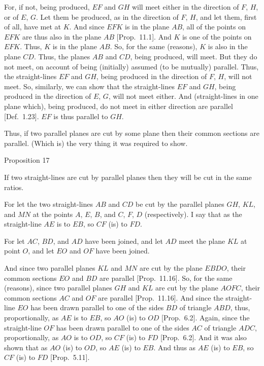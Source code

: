 \centerline{}

For, if not, being produced, $EF$ and $GH$ will  meet either in the direction of $F$, $H$, 
 or of $E$, $G$. Let them  be produced, as  in the  direction of $F$, $H$, and let them, first of all, have met at $K$. And since $EFK$ is in the plane $AB$, all
 of the points on $EFK$ are thus also in the plane $AB$ [Prop.~11.1]. And $K$ is one of the points on $EFK$. Thus, $K$ is in the
 plane $AB$. So, for the same (reasons), $K$ is also in the plane $CD$. 
 Thus, the planes $AB$ and $CD$, being produced, will meet. But they do
 not meet, on account of being (initially) assumed (to be mutually) parallel. Thus,
 the straight-lines $EF$ and $GH$, being produced in the
direction of $F$, $H$, will not meet. So, similarly, we can show that the straight-lines
 $EF$ and $GH$, being produced in the direction of $E$, $G$, will not meet
 either. And (straight-lines in one plane which), being produced,  do not meet in either direction
 are parallel [Def.~1.23]. $EF$ is thus parallel to $GH$.
 
 Thus, if two parallel planes are cut by some plane
then their common sections are parallel. (Which is) the very thing it was
required to show.



\begin{center}
{\large Proposition 17}
\end{center}

If two straight-lines are cut by parallel planes then
they will be cut in the same ratios.

For let the two straight-lines $AB$ and $CD$ be cut by the parallel planes
$GH$, $KL$, and $MN$ at the points $A$, $E$, $B$,  and $C$, $F$, $D$ (respectively). I say that as the straight-line $AE$ is to $EB$, so $CF$ (is)
to $FD$.

For let $AC$, $BD$, and $AD$ have been joined, and let $AD$ meet the
plane $KL$ at point $O$, and let $EO$ and $OF$ have been joined.

And since two parallel planes $KL$ and $MN$ are cut by the
plane $EBDO$, their common sections $EO$ and $BD$ are parallel
[Prop.~11.16]. So, for the same (reasons), 
since two parallel planes $GH$ and $KL$ are cut by the plane
$AOFC$, their common sections $AC$ and $OF$ are 
parallel [Prop.~11.16]. And since the straight-line $EO$ has been drawn parallel to
one of the sides $BD$ of triangle $ABD$, thus, proportionally, as 
$AE$ is to $EB$, so $AO$ (is) to $OD$ [Prop.~6.2]. 
Again, since the straight-line $OF$ has been drawn parallel to one of the sides $AC$
of triangle $ADC$, proportionally, as $AO$ is to $OD$, so $CF$ (is) to $FD$ [Prop.~6.2]. And it was also shown that as $AO$ (is) to $OD$, so $AE$ (is) to $EB$.
And thus as $AE$ (is) to $EB$, so $CF$ (is) to $FD$ [Prop.~5.11].

